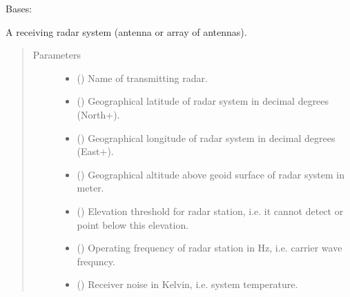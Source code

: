 \documentclass[letterpaper,10pt,english]{sphinxmanual}
\begin{document}
\begin{fulllineitems}
\label{\detokenize{modules/antenna:antenna.AntennaRX}}
Bases: 

A receiving radar system (antenna or array of antennas).
\begin{quote}\begin{description}
\item[{Parameters}] \leavevmode\begin{itemize}
\item {} 
 () \textendash{} Name of transmitting radar.

\item {} 
 () \textendash{} Geographical latitude of radar system in decimal degrees  (North+).

\item {} 
 () \textendash{} Geographical longitude of radar system in decimal degrees (East+).

\item {} 
 () \textendash{} Geographical altitude above geoid surface of radar system in meter.

\item {} 
 () \textendash{} Elevation threshold for radar station, i.e. it cannot detect or point below this elevation.

\item {} 
 () \textendash{} Operating frequency of radar station in Hz, i.e. carrier wave frequncy.

\item {} 
 () \textendash{} Receiver noise in Kelvin, i.e. system temperature.


\end{itemize}
\end{description}
\end{quote}
\end{fulllineitems}
\end{document}
